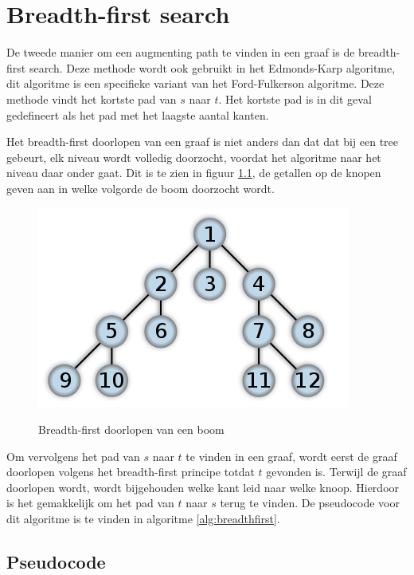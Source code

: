 \chapter{Breadth-first search}
\label{chap:breadthfirst}

De tweede manier om een augmenting path te vinden in een graaf is de breadth-first search. Deze methode wordt ook gebruikt in het Edmonds-Karp algoritme, dit algoritme is een specifieke variant van het Ford-Fulkerson algoritme. Deze methode vindt het kortste pad van $s$ naar $t$. Het kortste pad is in dit geval gedefineert als het pad met het laagste aantal kanten.

Het breadth-first doorlopen van een graaf is niet anders dan dat dat bij een tree gebeurt, elk niveau wordt volledig doorzocht, voordat het algoritme naar het niveau daar onder gaat. Dit is te zien in figuur \ref{fig:breadthFirstTree}, de getallen op de knopen geven aan in welke volgorde de boom doorzocht wordt.

\begin{figure}[h]
 \centering
 \includegraphics[width=0.5\linewidth]{breadthfirst/breadthfirsttree}
 \label{fig:breadthFirstTree}
 \caption{Breadth-first doorlopen van een boom}
\end{figure}

Om vervolgens het pad van $s$ naar $t$ te vinden in een graaf, wordt eerst de graaf doorlopen volgens het breadth-first principe totdat $t$ gevonden is. Terwijl de graaf doorlopen wordt, wordt bijgehouden welke kant leid naar welke knoop. Hierdoor is het gemakkelijk om het pad van $t$ naar $s$ terug te vinden. De pseudocode voor dit algoritme is te vinden in algoritme \ref{alg:breadthfirst}.

\section{Pseudocode}

